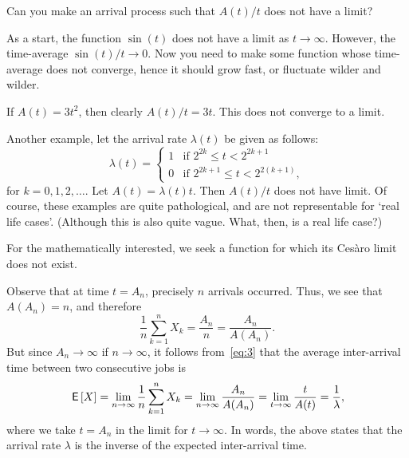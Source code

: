 \begin{extra}
  Can you make an arrival process such that $A(t)/t$ does not have a
  limit?  
\begin{hint}
As a start, the function $\sin(t)$ does not have a limit as
    $t\to\infty$. However, the time-average $\sin(t)/t \to 0$.  Now
    you need to make some function whose time-average does not
    converge, hence it should grow fast, or fluctuate wilder and
    wilder.
\end{hint}
\begin{solution}
 If $A(t) = 3 t^2$, then clearly $A(t)/t = 3t$. This does not
    converge to a limit. 

  Another example, let the arrival rate $\lambda(t)$ be given as
    follows:
    \begin{equation*}
      \lambda(t) = 
    \begin{cases}
      1 & \text{if } 2^{2k} \leq t < 2^{2k+1} \\
      0 & \text{if } 2^{2k+1} \leq t < 2^{2(k+1)},
    \end{cases}
    \end{equation*}
    for $k=0,1,2,\ldots$. Let $A(t) = \lambda(t) t$. Then $A(t)/t$
    does not have limit. Of course, these examples are quite
    pathological, and are not representable for `real life cases'.
    (Although this is also quite vague. What, then, is a real life
    case?)

For the mathematically interested, we seek a
    function for which its Ces\`aro limit does not exist.
\end{solution}
\end{extra}



Observe that at time $t=A_n$, precisely $n$ arrivals occurred.
Thus,
we see that $A(A_n) = n$, and therefore
\begin{equation*}
  \frac{1}n\sum_{k=1}^n X_k = \frac{A_n}n = \frac{A_n}{A(A_n)}. 
\end{equation*}
But since $A_n\to\infty$ if $n\to\infty$, it follows from~\cref{eq:3} that the average inter-arrival time between two consecutive jobs is
\begin{equation}\label{eq:54}
  \,\mathsf{E}\left[X\right] = \lim_{n\to\infty}  \frac{1}n\sum_{k=1}^n X_k = \lim_{n\to \infty} \frac{A_n}{A(A_n)} = \lim_{t\to\infty} \frac t{A(t)} = \frac 1 \lambda,
\end{equation}
where we take $t=A_n$ in the limit for $t\to\infty$.
In words, the above states that the arrival rate $\lambda$ is the inverse of the expected inter-arrival time.

